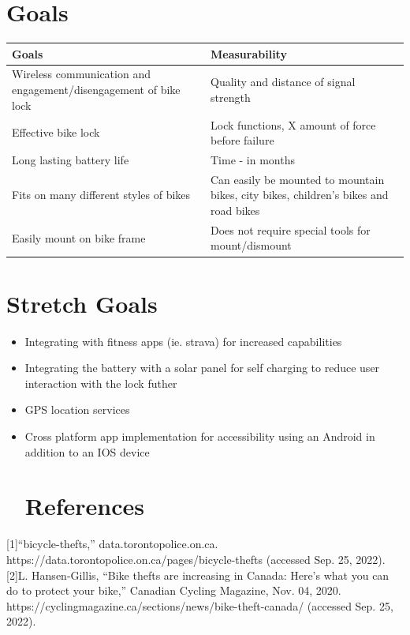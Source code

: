\documentclass{article}
\begin{document}
\section{Goals}
\begin{table}[hp]
  \begin{center}
    \begin{tabular}{| p{0.5\linewidth} | p{0.5\linewidth} |}
    \hline
      \textbf{Goals} & \textbf{Measurability}\\
      \hline
      Wireless communication and engagement/disengagement of bike lock  & Quality and distance of signal strength\\
      \hline
      Effective bike lock  & Lock functions, X amount of force before failure\\
      \hline
      Long lasting battery life  & Time - in months \\
      \hline
      Fits on many different styles of bikes & Can easily be mounted to mountain bikes, city bikes, children's bikes and road bikes \\
      \hline
      Easily mount on bike frame & Does not require special tools for mount/dismount\\
      \hline
    \end{tabular}
  \end{center}
\end{table}

\section{Stretch Goals}
\begin{itemize}
\item Integrating with fitness apps (ie. strava) for increased capabilities
\item Integrating the battery with a solar panel for self charging to reduce user interaction with the lock futher
\item GPS location services
\item Cross platform app implementation for accessibility using an Android in addition to an IOS device
\section{References}
\end{itemize}

[1]“bicycle-thefts,” data.torontopolice.on.ca. https://data.torontopolice.on.ca/pages/bicycle-thefts (accessed Sep. 25, 2022).
[2]L. Hansen-Gillis, “Bike thefts are increasing in Canada: Here’s what you can do to protect your bike,” Canadian Cycling Magazine, Nov. 04, 2020. https://cyclingmagazine.ca/sections/news/bike-theft-canada/ (accessed Sep. 25, 2022).
‌
‌
\end{document}
